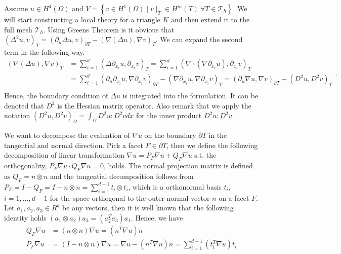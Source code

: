 Assume $u \in H^{4}( \Omega ) $ and $V = \left\{ v \in H^{1}( \Omega )  \mid  v \mid _{T} \in H^{m}( T) \ \forall T \in \mathcal{T} _{h}   \right\} $. We will start constructing a local theory for a triangle $K$ and then extend it to the full mesh
$\mathcal{T}_{h} $. Using Greens Theorem is it obvious that \(
\left( \Delta ^2 u,v \right) _{T }   = \left( \partial _{n} \Delta u, v \right) _{\partial T  } - \left( \nabla \left( \Delta  u \right) , \nabla v \right) _{T }
\).
We can expand the second term in the following way.
\begin{equation*}
    \begin{split}
( \nabla ( \Delta u ) , \nabla v ) _{T } & = \sum_{i = 1}^{ d}  ( \Delta  \partial _{x_{i}} u, \partial _{x_{i}}v ) _{T }  = \sum_{i = 1}^{d}  ( \nabla \cdot ( \nabla \partial _{x_{i}} u ) , \partial _{x_{i}} v )_{T }  \\
&= \sum_{i = 1}^{d}  ( \partial_n  \partial _{x_{i}} u, \nabla  \partial _{x_{i}} v ) _{\partial T } -   ( \nabla \partial _{x_{i}} u, \nabla \partial _{x_{i}} v )_{T }
= (  \partial_n\nabla u, \nabla v ) _{\partial_{} T  } - ( D^2 u, D^2v ) _{T } \\
    \end{split}
.\end{equation*}
Hence, the boundary condition of $\Delta u$ is integrated into the formulation.  It can be denoted that $D^2$ is the Hessian matrix operator. Also remark that we apply the notation
$( D^2u, D^2v )_{\Omega } = \int_{\Omega }^{} D^{2}u : D^2v  dx$ for the inner product $D^2u:D^2v$.

We want to decompose the evaluation of $\nabla  u $ on the boundary $\partial T$ in the tangential and normal direction. Pick a facet  $F \in \partial T$, then we define the following decomposition of linear transformation $\nabla u = P_{F}\nabla u  + Q_{F}  \nabla u  $ s.t. the
orthogonality, $
P_{F} \nabla u  \cdot Q_{F}  \nabla u = 0$, holds. The normal projection matrix is defined as $Q_{F} = n \otimes n $ and the tangential decomposition follows from $ P_{F} = I - Q_{F} = I - n \otimes n  =  \sum_{i=1}^{d-1} t_{i} \otimes t_i$, which
is a orthonormal basis $t_{i}$, $i = 1, \ldots, d-1$ for the space orthogonal to the outer normal vector $n$ on a facet $F$. Let $ a_{1}, a_{2}, a_{3} \in R^{d}$ be any vectors, then it is well known that the following identity holds $ ( a_{1}
\otimes a_{2}  ) a_{3} = ( a_{2}^{T}  a_{3}) a_{1} $. Hence, we have
\begin{equation}
\label{eq:projection}
    \begin{split}
   Q_{F} \nabla u & = ( n \otimes n ) \nabla u =  (n^{T} \nabla u)n \\
   P_{F} \nabla u & =( I - n \otimes n ) \nabla u =   \nabla u  - (n^{T}  \nabla u)n =  \sum_{ i =1 }^{d-1} ( t_{i}^{T}  \nabla u ) t_{i}
    \end{split}
\end{equation}


